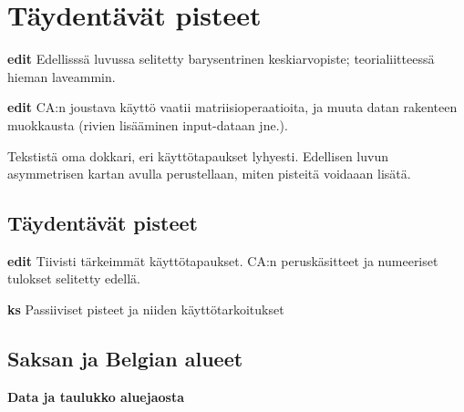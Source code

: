 \documentclass[
  finnish,
]{book}
\newenvironment{Shaded}{\begin{snugshade}}{\end{snugshade}}
\newcommand{\CommentTok}[1]{\textcolor[rgb]{0.56,0.35,0.01}{\textit{#1}}}
\newcommand{\DataTypeTok}[1]{\textcolor[rgb]{0.13,0.29,0.53}{#1}}
\newcommand{\DecValTok}[1]{\textcolor[rgb]{0.00,0.00,0.81}{#1}}
\newcommand{\KeywordTok}[1]{\textcolor[rgb]{0.13,0.29,0.53}{\textbf{#1}}}
\newcommand{\NormalTok}[1]{#1}
\newcommand{\OperatorTok}[1]{\textcolor[rgb]{0.81,0.36,0.00}{\textbf{#1}}}
\newcommand{\OtherTok}[1]{\textcolor[rgb]{0.56,0.35,0.01}{#1}}
\newcommand{\StringTok}[1]{\textcolor[rgb]{0.31,0.60,0.02}{#1}}
\begin{document}
\hypertarget{tuxe4ydentuxe4vuxe4t-pisteet}{%
\chapter{Täydentävät pisteet}\label{tuxe4ydentuxe4vuxe4t-pisteet}}

\textbf{edit} Edellisssä luvussa selitetty barysentrinen keskiarvopiste;
teorialiitteessä hieman laveammin.

\textbf{edit} CA:n joustava käyttö vaatii matriisioperaatioita, ja muuta datan rakenteen
muokkausta (rivien lisääminen input-dataan jne.).

Tekstistä oma dokkari, eri käyttötapaukset lyhyesti. Edellisen luvun asymmetrisen
kartan avulla perustellaan, miten pisteitä voidaaan lisätä.

\hypertarget{tuxe4ydentuxe4vuxe4t-pisteet-1}{%
\section{Täydentävät pisteet}\label{tuxe4ydentuxe4vuxe4t-pisteet-1}}

\textbf{edit} Tiivisti tärkeimmät käyttötapaukset. CA:n peruskäsitteet ja numeeriset
tulokset selitetty edellä.

\textbf{ks} Passiiviset pisteet ja niiden käyttötarkoitukset

\hypertarget{saksan-ja-belgian-alueet}{%
\section{Saksan ja Belgian alueet}\label{saksan-ja-belgian-alueet}}

\textbf{Data ja taulukko aluejaosta}

\begin{Shaded}
\end{Shaded}
\end{document}
